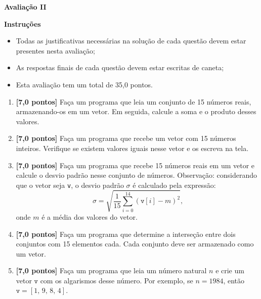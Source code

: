 \documentclass[12pt,a4paper]{article}
\begin{document}
\begin{center}
 \textbf{Avaliação II}
\end{center}

\textbf{Instruções}
\begin{itemize}
 \item Todas as justificativas necessárias na solução de cada questão devem 
 estar presentes nesta avaliação;
 \item As respostas finais de cada questão devem estar escritas de caneta;
 \item Esta avaliação tem um total de 35,0 pontos.
\end{itemize}

\begin{enumerate}
  \item \textbf{[7,0 pontos]} Faça um programa que leia um conjunto de 15 números
  reais, armazenando-os em um vetor. Em seguida, calcule a soma e o produto desses
  valores.
  
  \item \textbf{[7,0 pontos]} Faça um programa que recebe um vetor com 15 números
  inteiros. Verifique se existem valores iguais nesse vetor e os escreva na tela.
  
  \item \textbf{[7,0 pontos]} Faça um programa que recebe 15 números reais em 
  um vetor e calcule o desvio padrão nesse conjunto
  de números. Observação:
  considerando que o vetor seja \texttt{v}, o desvio padrão $\sigma$ é 
  calculado pela expressão:
  $$\sigma = \sqrt{\frac{1}{15} \sum_{i = 0}^{14} (\texttt{v}[i] - m)^2}\textrm{,}$$
  onde $m$ é a média dos valores do vetor.
  
  \item \textbf{[7,0 pontos]} Faça um programa que determine a interseção entre
  dois conjuntos com 15 elementos cada. Cada conjunto deve ser armazenado como
  um vetor.

  \item \textbf{[7,0 pontos]} Faça um programa que leia um número natural $n$ 
  e crie um vetor $\texttt{v}$ com os algarismos desse número. Por exemplo,
  se $n = 1984$, então $\texttt{v} = [1,\,9,\,8,\,4]$.

\end{enumerate}
\end{document}
